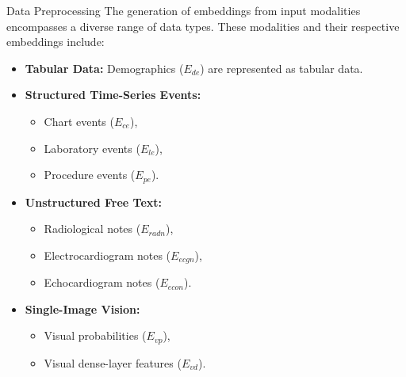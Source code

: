 \documentclass{sintefbeamer}
\theoremstyle{definition}
\begin{document}
\begin{frame}{Data Preprocessing}
\small
The generation of embeddings from input modalities encompasses a diverse range of data types. These modalities and their respective embeddings include:
\begin{itemize}
    \item \textbf{Tabular Data:} Demographics (\(E_{de}\)) are represented as tabular data.
    \item \textbf{Structured Time-Series Events:} 
    \begin{itemize}
        \item Chart events (\(E_{ce}\)),
        \item Laboratory events (\(E_{le}\)),
        \item Procedure events (\(E_{pe}\)).
    \end{itemize}
    \item \textbf{Unstructured Free Text:} 
    \begin{itemize}
        \item Radiological notes (\(E_{radn}\)),
        \item Electrocardiogram notes (\(E_{ecgn}\)),
        \item Echocardiogram notes (\(E_{econ}\)).
    \end{itemize}
    \item \textbf{Single-Image Vision:} 
    \begin{itemize}
        \item Visual probabilities (\(E_{vp}\)),
        \item Visual dense-layer features (\(E_{vd}\)).
    \end{itemize}
    
\end{itemize}
\end{frame}
\end{document}
